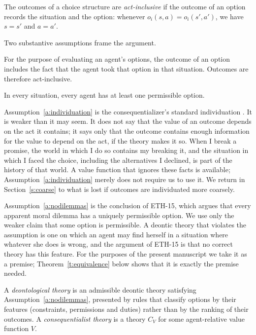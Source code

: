\documentclass{situationist-preprint}
\begin{document}
\begin{definition}\label{d:inclusive}
The outcomes of a choice structure are \emph{act-inclusive} if the outcome of an option records the situation and the option: whenever $o_i(s,a) = o_i(s',a')$, we have $s = s'$ and $a = a'$.
\end{definition}

Two substantive assumptions frame the argument.

\begin{assumption}[Individuation]\label{a:individuation}
For the purpose of evaluating an agent's options, the outcome of an option includes the fact that the agent took that option in that situation. Outcomes are therefore act-inclusive.
\end{assumption}

\begin{assumption}[No dilemmas]\label{a:nodilemmas}
In every situation, every agent has at least one permissible option.
\end{assumption}

Assumption~\ref{a:individuation} is the consequentializer's standard individuation \citep{Portmore2007,Dreier2011}. It is weaker than it may seem. It does not say that the value of an outcome depends on the act it contains; it says only that the outcome contains enough information for the value to depend on the act, if the theory makes it so. When I break a promise, the world in which I do so contains my breaking it, and the situation in which I faced the choice, including the alternatives I declined, is part of the history of that world. A value function that ignores these facts is available; Assumption~\ref{a:individuation} merely does not require us to use it. We return in Section~\ref{s:coarse} to what is lost if outcomes are individuated more coarsely.

Assumption~\ref{a:nodilemmas} is the conclusion of ETH-15, which argues that every apparent moral dilemma has a uniquely permissible option. We use only the weaker claim that some option is permissible. A deontic theory that violates the assumption is one on which an agent may find herself in a situation where whatever she does is wrong, and the argument of ETH-15 is that no correct theory has this feature. For the purposes of the present manuscript we take it as a premise; Theorem~\ref{t:equivalence} below shows that it is exactly the premise needed.

\begin{definition}\label{d:families}
A \emph{deontological theory} is an admissible deontic theory satisfying Assumption~\ref{a:nodilemmas}, presented by rules that classify options by their features (constraints, permissions and duties) rather than by the ranking of their outcomes. A \emph{consequentialist theory} is a theory $C_V$ for some agent-relative value function $V$.
\end{definition}
\end{document}
